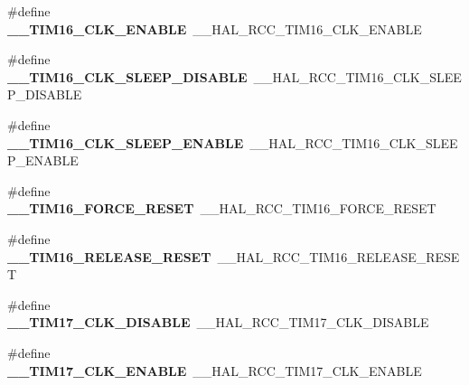 \begin{DoxyCompactItemize}
\mbox{\label{group___h_a_l___r_c_c___aliased_ga9dc682b745cf3b2bb955bcc5feb4bcd3}} 
\#define {\bfseries \+\_\+\+\_\+\+T\+I\+M16\+\_\+\+C\+L\+K\+\_\+\+E\+N\+A\+B\+LE}~\+\_\+\+\_\+\+H\+A\+L\+\_\+\+R\+C\+C\+\_\+\+T\+I\+M16\+\_\+\+C\+L\+K\+\_\+\+E\+N\+A\+B\+LE
\item 
\mbox{\label{group___h_a_l___r_c_c___aliased_ga95b0b3e155fea0b19e66b5d38f4a3810}} 
\#define {\bfseries \+\_\+\+\_\+\+T\+I\+M16\+\_\+\+C\+L\+K\+\_\+\+S\+L\+E\+E\+P\+\_\+\+D\+I\+S\+A\+B\+LE}~\+\_\+\+\_\+\+H\+A\+L\+\_\+\+R\+C\+C\+\_\+\+T\+I\+M16\+\_\+\+C\+L\+K\+\_\+\+S\+L\+E\+E\+P\+\_\+\+D\+I\+S\+A\+B\+LE
\item 
\mbox{\label{group___h_a_l___r_c_c___aliased_gade54c71fcbd16e23c401a6f219df9eaf}} 
\#define {\bfseries \+\_\+\+\_\+\+T\+I\+M16\+\_\+\+C\+L\+K\+\_\+\+S\+L\+E\+E\+P\+\_\+\+E\+N\+A\+B\+LE}~\+\_\+\+\_\+\+H\+A\+L\+\_\+\+R\+C\+C\+\_\+\+T\+I\+M16\+\_\+\+C\+L\+K\+\_\+\+S\+L\+E\+E\+P\+\_\+\+E\+N\+A\+B\+LE
\item 
\mbox{\label{group___h_a_l___r_c_c___aliased_ga0e1e4dcad1f5857030a9a6aec4ba4750}} 
\#define {\bfseries \+\_\+\+\_\+\+T\+I\+M16\+\_\+\+F\+O\+R\+C\+E\+\_\+\+R\+E\+S\+ET}~\+\_\+\+\_\+\+H\+A\+L\+\_\+\+R\+C\+C\+\_\+\+T\+I\+M16\+\_\+\+F\+O\+R\+C\+E\+\_\+\+R\+E\+S\+ET
\item 
\mbox{\label{group___h_a_l___r_c_c___aliased_gabc91257ee41523107cae6d7f3413750b}} 
\#define {\bfseries \+\_\+\+\_\+\+T\+I\+M16\+\_\+\+R\+E\+L\+E\+A\+S\+E\+\_\+\+R\+E\+S\+ET}~\+\_\+\+\_\+\+H\+A\+L\+\_\+\+R\+C\+C\+\_\+\+T\+I\+M16\+\_\+\+R\+E\+L\+E\+A\+S\+E\+\_\+\+R\+E\+S\+ET
\item 
\mbox{\label{group___h_a_l___r_c_c___aliased_ga221f536db3bd69c4a9617067509cc328}} 
\#define {\bfseries \+\_\+\+\_\+\+T\+I\+M17\+\_\+\+C\+L\+K\+\_\+\+D\+I\+S\+A\+B\+LE}~\+\_\+\+\_\+\+H\+A\+L\+\_\+\+R\+C\+C\+\_\+\+T\+I\+M17\+\_\+\+C\+L\+K\+\_\+\+D\+I\+S\+A\+B\+LE
\item 
\mbox{\label{group___h_a_l___r_c_c___aliased_ga0208b98e98d5baeb46f39c7ed5ae3351}} 
\#define {\bfseries \+\_\+\+\_\+\+T\+I\+M17\+\_\+\+C\+L\+K\+\_\+\+E\+N\+A\+B\+LE}~\+\_\+\+\_\+\+H\+A\+L\+\_\+\+R\+C\+C\+\_\+\+T\+I\+M17\+\_\+\+C\+L\+K\+\_\+\+E\+N\+A\+B\+LE

\end{DoxyCompactItemize}
